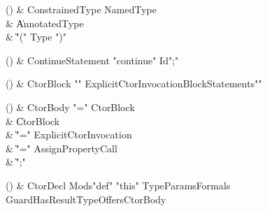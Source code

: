 \begin{bbgrammarappendix}

() & ConstrainedType \label{prod:ConstrainedType}  \: NamedType  \\

 &    \| AnnotatedType \\
 &    \| \xcd"(" Type \xcd")" \\

\end{bbgrammarappendix}

\begin{bbgrammarappendix}

() & ContinueStatement \label{prod:ContinueStatement}  \: \xcd"continue" Id\opt \xcd";"  \\


\end{bbgrammarappendix}

\begin{bbgrammarappendix}

() & CtorBlock \label{prod:CtorBlock}  \: \xcd"{" ExplicitCtorInvocation\opt BlockStatements\opt \xcd"}"  \\


\end{bbgrammarappendix}

\begin{bbgrammarappendix}

() & CtorBody \label{prod:CtorBody}  \: \xcd"=" CtorBlock  \\

 &    \| CtorBlock \\
 &    \| \xcd"=" ExplicitCtorInvocation \\
 &    \| \xcd"=" AssignPropertyCall \\
 &    \| \xcd";" \\

\end{bbgrammarappendix}

\begin{bbgrammarappendix}

() & CtorDecl \label{prod:CtorDecl}  \: Mods\opt \xcd"def" \xcd"this" TypeParams\opt Formals Guard\opt HasResultType\opt Offers\opt CtorBody  \\


\end{bbgrammarappendix}

